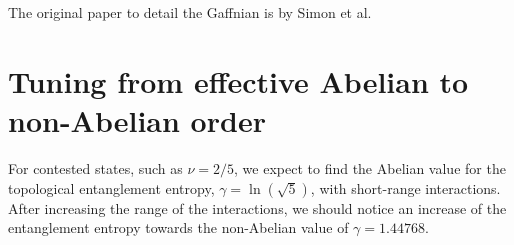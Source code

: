 \documentclass[floatfix,showpacs,amsmath,amsfonts,amssymb,aps,twocolumn, prb,groupedaddress]{revtex4-1}
\begin{document}
The original paper to detail the Gaffnian is by Simon et al.~\cite{Simon07}



\section{Tuning from effective Abelian to non-Abelian order}

For contested states, such as $\nu=2/5$, we expect to find the Abelian value for the topological entanglement entropy, $\gamma=\ln(\sqrt{5})$, with short-range interactions. After increasing the range of the interactions, we should notice an increase of the entanglement entropy towards the non-Abelian value of $\gamma=1.44768$.



\end{document}
